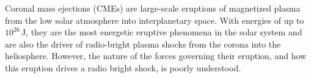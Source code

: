 
\begin{abstracts} 

Coronal mass ejections (CMEs) are large-scale eruptions of magnetized plasma from the low solar atmosphere into interplanetary space. With energies of up to $10^{26}$\,J, they are the most energetic eruptive phenomena in the solar system and are also the driver of radio-bright plasma shocks from the corona into the heliosphere. However, the nature of the forces governing their eruption, and how this eruption drives a radio bright shock, is poorly understood.

\end{abstracts}

